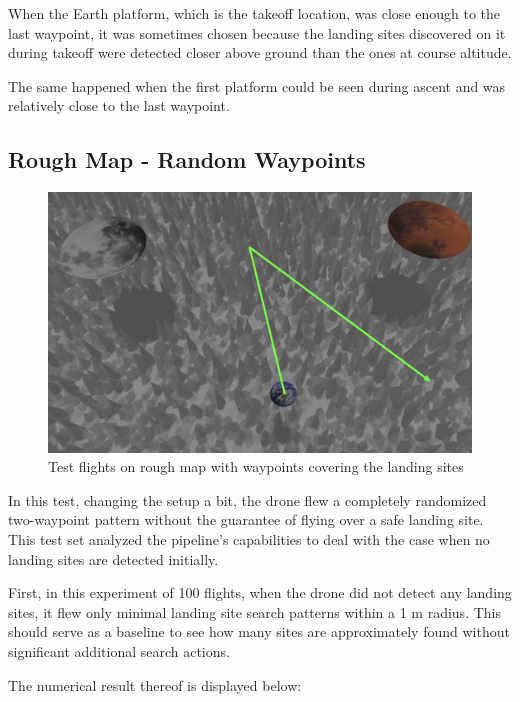         When the Earth platform, which is the takeoff location, was close enough to the last waypoint, it was sometimes chosen because the landing sites discovered on it during takeoff were detected closer above ground than the ones at course altitude.

        The same happened when the first platform could be seen during ascent and was relatively close to the last waypoint.

\clearpage%
\subsection{Rough Map - Random Waypoints}\label{subsec:rough_map_rw}

    \begin{figure}[h]
        \centering
        \includegraphics[scale=0.24]{images/evaluation/rough_complete_rand.png}
        \caption{Test flights on rough map with waypoints covering the landing sites}
        \label{fig:rough_compl_rand}
    \end{figure}

    In this test, changing the setup a bit, the drone flew a completely randomized two-waypoint pattern without the guarantee of flying over a safe landing site. This test set analyzed the pipeline's capabilities to deal with the case when no landing sites are detected initially.

    First, in this experiment of 100 flights, when the drone did not detect any landing sites, it flew only minimal landing site search patterns within a 1 m radius. This should serve as a baseline to see how many sites are approximately found without significant additional search actions.

    The numerical result thereof is displayed below:

